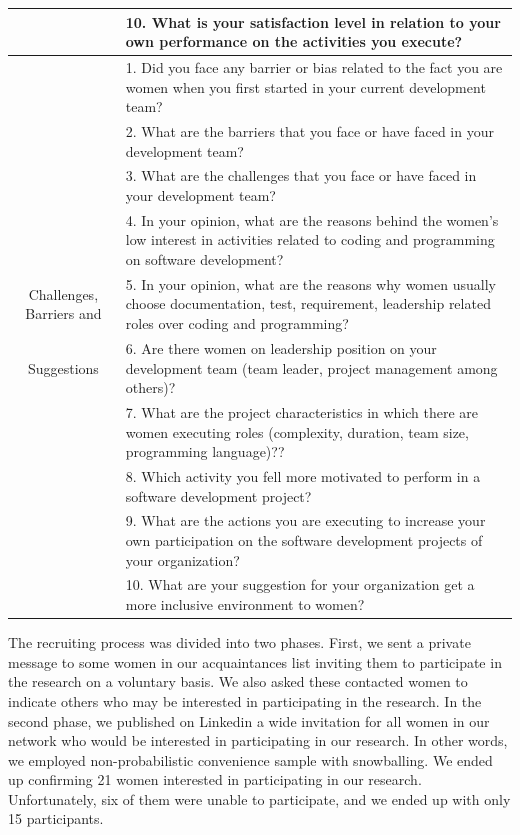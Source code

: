 \documentclass{IEEEcsmag}
\begin{document}
\begin{table}[htpb]
\begin{center}
\begin{tabular}{|c|p{13cm}|}
         & 10. What is your satisfaction level in relation to your own performance on the activities you execute?\\
         \hline
         & 1. Did you face any barrier or bias related to the fact you are women when you first started in your current development team? \\
         & 2. What are the barriers that you face or have faced in your development team? \\
         & 3. What are the challenges that you face or have faced in your development team? \\
         & 4. In your opinion, what are the reasons behind the women's low interest in activities related to coding and programming on software development? \\
         \multicolumn{1}{|p{1.5cm}|}{Challenges, Barriers and} & 5. In your opinion, what are the reasons why women usually choose documentation, test, requirement, leadership related roles over coding and programming? \\
         Suggestions & 6. Are there women on leadership position on your development team (team leader, project management among others)? \\
         & 7. What are the project characteristics in which there are women executing roles (complexity, duration, team size, programming language)?? \\
         & 8. Which activity you fell more motivated to perform in a software development project?\\
         & 9. What are the actions you are executing to increase your own participation on the software development projects of your organization? \\
         & 10. What are your suggestion for your organization get a more inclusive environment to women?\\
         \hline
    \end{tabular}
    \label{tab:questions}
\end{center}
\end{table}

The recruiting process was divided into two phases. First, we sent a private message to some women in our acquaintances list inviting them to participate in the research on a voluntary basis. We also asked these contacted women to indicate others who may be interested in participating in the research. In the second phase, we published on Linkedin a wide invitation for all women in our network who would be interested in participating in our research. In other words, we employed non-probabilistic convenience sample with snowballing.  We ended up confirming 21 women interested in participating in our research. Unfortunately, six of them were unable to participate, and we ended up with only 15 participants. 
\end{document}
